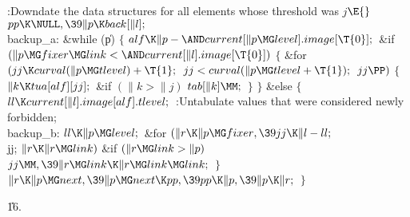 \Y\B\4:Downdate the data structures for all elements whose threshold was
$j$\X${}\E{}$\6
$\\{pp}\K\NULL,\39\|p\K\\{back}[\|l];{}$\6
\4\\{backup\_a}:\5
\&{while} (\|p)\5
${}\{{}$\1\6
${}\\{alf}\K\|p-{\AND}\\{current}[\|p\MG\\{level}].\\{image}[\T{0}];{}$\6
\&{if} ${}(\|p\MG\\{fixer}\MG\\{link}<{\AND}\\{current}[\|l].\\{image}[%
\T{0}]){}$\5
${}\{{}$\1\6
\&{for} ${}(\\{jj}\K\\{curval}(\|p\MG\\{tlevel})+\T{1};{}$ ${}\\{jj}<%
\\{curval}(\|p\MG\\{tlevel}+\T{1});{}$ ${}\\{jj}\PP){}$\5
${}\{{}$\1\6
${}\|k\K\\{tua}[\\{alf}][\\{jj}];{}$\6
\&{if} ${}(\|k>\|j){}$\1\5
${}\\{tab}[\|k]\MM;{}$\2\6
\4${}\}{}$\2\6
\4${}\}{}$\5
\2\&{else}\5
${}\{{}$\1\6
${}\\{ll}\K\\{current}[\|l].\\{image}[\\{alf}].\\{tlevel};{}$\6
:Untabulate values that were considered newly forbidden\X;\6
\4\\{backup\_b}:\5
${}\\{ll}\K\|p\MG\\{level};{}$\6
\&{for} ${}(\|r\K\|p\MG\\{fixer},\39\\{jj}\K\|l-\\{ll};{}$ \\{jj}; ${}\|r\K\|r%
\MG\\{link}){}$\1\6
\&{if} ${}(\|r\MG\\{link}>\|p){}$\1\5
${}\\{jj}\MM,\39\|r\MG\\{link}\K\|r\MG\\{link}\MG\\{link};{}$\2\2\6
\4${}\}{}$\2\6
${}\|r\K\|p\MG\\{next},\39\|p\MG\\{next}\K\\{pp},\39\\{pp}\K\|p,\39\|p\K\|r;{}$%
\6
\4${}\}{}$\2\par
\U16.\fi

